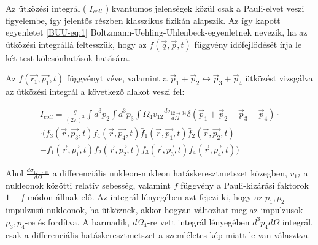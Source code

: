 \documentclass[a4paper,12pt]{article}
\begin{document}
\vspace{5mm}

\par Az ütközési integrál ( $I_{coll}$ ) kvantumos jelenségek közül csak a Pauli-elvet veszi figyelembe, így jelentős részben klasszikus fizikán alapszik. Az így kapott egyenletet \eqref{BUU-eq:1} Boltzmann-Uehling-Uhlenbeck-egyenletnek nevezik, ha az ütközési integrállá feltesszük, hogy az $f(\vec{q}, \vec{p}, t)$ függvény időfejlődését írja le két-test kölcsönhatások hatására. 

\vspace{5mm}

\par Az $f(\vec{r_{1}}, \vec{p_{1}}, t)$ függvényt véve, valamint a $\vec{p}_{1} + \vec{p}_{2} \longleftrightarrow \vec{p}_{3} + \vec{p}_{4}$ ütközést vizsgálva az ütközési integrál a következő alakot veszi fel:

\vspace{5mm}

\begin{equation}
\begin{split}
I_{coll} = \frac{g}{(2\pi)^{3}}\int d^{3}p_{2}\int d^{3}p_{3}\int \Omega_{4}v_{12}\frac{d\sigma_{12 \rightarrow 34}}{d\Omega}\delta(\vec{p}_{1} + \vec{p}_{2} - \vec{p}_{3} - \vec{p}_{4})\cdot\\
\cdot(f_{3}(\vec{r}, \vec{p_{3}}, t)f_{4}(\vec{r}, \vec{p_{4}}, t)\bar{f}_{1}(\vec{r}, \vec{p_{1}}, t)\bar{f}_{2}(\vec{r}, \vec{p_{2}}, t) \\
- f_{1}(\vec{r}, \vec{p_{1}}, t)f_{2}(\vec{r}, \vec{p_{2}}, t)\bar{f}_{3}(\vec{r}, \vec{p_{3}}, t)\bar{f}_{4}(\vec{r}, \vec{p_{4}}, t))
\end{split}
\end{equation}

\vspace{5mm}

\par Ahol $\frac{d\sigma_{12 \rightarrow 34}}{d\Omega}$ a differenciális nukleon-nukleon hatáskeresztmetszet közegben, $v_{12}$ a nukleonok közötti relatív sebesség, valamint $\bar{f}$ függvény a Pauli-kizárási faktorok $1 - f$ módon állnak elő. Az integrál lényegében azt fejezi ki, hogy az $p_{1},p_{2}$ impulzusú nukleonok, ha ütköznek, akkor hogyan változhat meg az impulzusok $p_{3}, p_{4}$-re és fordítva. A harmadik, $d\Omega_{4}$-re vett integrál lényegében $d^{3}p_{4}d\Omega$ integrál, csak a differenciális hatáskeresztmetszet a szemléletes kép miatt le van választva.
\end{document}

